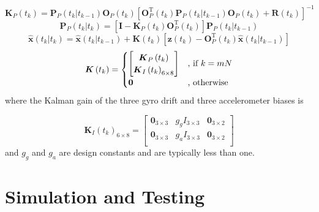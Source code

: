 \documentclass[a4paper]{report}
\numberwithin{equation}{chapter}
\newcommand{\mat}[1]{\boldsymbol{#1}}
\begin{document}
\begin{equation}
\mat{K}_P \left( t_k \right) = \mat{P}_P \left( t_k | t_{k - 1} \right) \mat{O}_P \left( t_k \right) \left[ \mat{O}^{\mathrm{T}}_P \left( t_k \right) \mat{P}_P \left( t_k | t_{k - 1} \right) \mat{O}_P \left( t_k \right) + \mat{R} \left( t_k \right) \right]^{-1}
\end{equation}
\begin{equation}
\mat{P}_P \left( t_k | t_k \right) = \left[ \mat{I} - \mat{K}_P \left( t_k \right) \mat{O}_P^{\mathrm{T}} \left( t_k \right) \right] \mat{P}_P \left( t_k | t_{k - 1} \right)
\end{equation}
\begin{equation}
\hat{\mat{x}} \left( t_k | t_k \right) = \hat{\mat{x}} \left( t_k | t_{k - 1} \right) + \mat{K} \left( t_k \right) \left[ \mat{z} \left( t_k \right) - \mat{O}_P^{\mathrm{T}} \left( t_k \right) \hat{\mat{x}} \left( t_k | t_{k - 1} \right) \right]
\end{equation}
\begin{equation}
\mat{K} \left( t_k \right) =
\begin{cases}
\begin{bmatrix}
\mat{K}_P \left( t_k \right)\\
\mat{K}_I \left( t_k \right)_{6 \times 8}\\
\end{bmatrix}
& \text{, if $ k = mN$} \\
\mat{0} & \text{, otherwise}
\end{cases}
\end{equation}
where the Kalman gain of the three gyro drift and three accelerometer biases is

\begin{equation}
\mat{K}_I \left( t_k \right)_{6 \times 8} =
\begin{bmatrix}
\mat{0}_{3 \times 3} & g_g I_{3 \times 3} & \mat{0}_{3 \times 2}\\
\mat{0}_{3 \times 3} & g_a I_{3 \times 3} & \mat{0}_{3 \times 2}\\
\end{bmatrix}
\end{equation}
and $g_g$ and $g_a$ are design constants and are typically less than one.

\section[Simulation and Testing]{Simulation and Testing}
\end{document}
